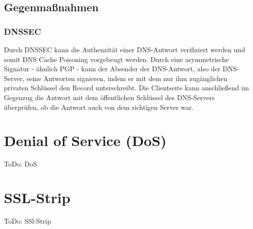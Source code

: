 \subsection*{Gegenmaßnahmen}

\subsubsection*{DNSSEC}
Durch DNSSEC kann die Authenzität einer DNS-Antwort verifiziert werden und somit DNS Cache Poisoning vorgebeugt werden. Durch eine asymmetrische Signatur -  ähnlich PGP - kann der Absender
der DNS-Antwort, also der DNS-Server, seine Antworten signieren, indem er mit dem nur ihm zugänglichen privaten Schlüssel den Record unterschreibt. Die Clientseite kann anschließend im 
Gegenzug die Antwort mit dem öffentlichen Schlüssel des DNS-Servers überprüfen, ob die Antwort auch von dem richtigen Server war.

\section{Denial of Service (DoS)}
ToDo: DoS

\section{SSL-Strip}
ToDo: SSl-Strip